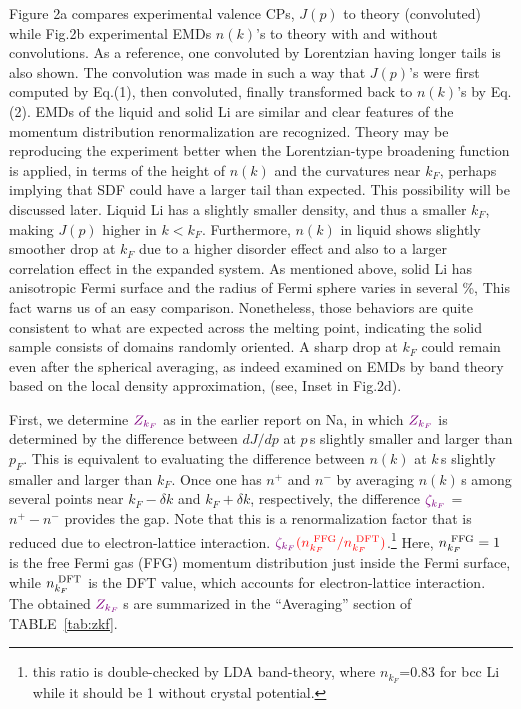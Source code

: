 \documentclass[twocolumn,showpacs,showkeys,fleqn,prl,superscriptaddress]{revtex4}%
\newcommand{\nn}[1]{\textnormal{ #1}}
\begin{document}
Figure 2a compares experimental valence CPs, $J(p)$ to theory (convoluted) while Fig.2b experimental EMDs $n(k)$’s to theory with and without convolutions. 
As a reference, one convoluted by Lorentzian having longer tails is also shown. 
The convolution was made in such a way that $J(p)$’s were first computed by Eq.(1), then convoluted, finally transformed back to $n(k)$’s by Eq. (2). 
EMDs of the liquid and solid Li are similar and clear features of the momentum distribution renormalization are recognized.  
Theory may be reproducing the experiment better when the Lorentzian-type broadening function is applied, in terms of the height of $n(k)$ and the curvatures near $k_F$, perhaps implying that SDF could have a larger tail than expected.
This possibility will be discussed later. 
Liquid Li has a slightly smaller density, and thus a smaller $k_F$, making $J(p)$ higher in $k < k_F$.
Furthermore, $n(k)$ in liquid shows slightly smoother drop at $ k_F $ due to a higher disorder effect and also to a larger correlation effect in the expanded system.
As mentioned above, solid Li has anisotropic Fermi surface and the radius of Fermi sphere varies in several \%\cite{saku95,schulke96}, This fact warns us of an easy comparison.
Nonetheless, those behaviors are quite consistent to what are expected across the melting point, indicating the solid sample consists of domains randomly oriented. 
A sharp drop at $k_F$ could remain even after the spherical averaging, as indeed examined on EMDs by band theory based on the local density approximation, (see, Inset in Fig.2d). 


First, we determine ${\color{violet}Z_{k_F}}$ as in the earlier report on Na\cite{simo10}, in which ${\color{violet}Z_{k_F}}$ is determined by the difference between $dJ/dp$ at $p\,$s slightly smaller and larger than $p_F$. 
This is equivalent to evaluating the difference between $n(k)$ at $k\,$s slightly smaller and larger than $k_F$.
Once one has $n^+$ and $n^-$ by averaging $n(k)$\,s among several points near $k_F-\delta k$ and  $k_F+\delta k$, respectively, the difference ${\color{violet}\zeta_{k_F}}$ = $n^+ - n^-$ provides the gap. 
Note that this is a renormalization factor that is reduced due to electron-lattice interaction. 
${\color{violet}\zeta_{k_F}}{\color{red}(n_{k_F}^{\nn{FFG}}/n_{k_F}^{\nn{DFT}})}$.\footnote{this ratio is double-checked by LDA band-theory, where {\color{red}$n_{k_F}$=0.83} for bcc Li while it should be 1 without crystal potential.}
Here, $n_{k_F}^{\nn{FFG}}=1$ is the free Fermi gas (FFG) momentum distribution just inside the Fermi surface, while $n_{k_F}^{\nn{DFT}}$ is the DFT value, which accounts for electron-lattice interaction. 
The obtained ${\color{violet}Z_{k_F}}\,$s are summarized in the ``Averaging'' section of TABLE~\ref{tab:zkf}.
\end{document}
